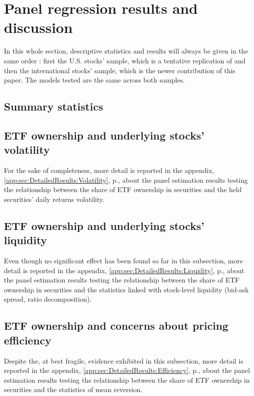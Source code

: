 
\section{Panel regression results and discussion}
\label{sec:Results}
In this whole section, descriptive statistics and results will always be given in the same order : first the U.S. stocks' sample, which is a tentative replication of \textcite{Ben-David2018} and then the international stocks' sample, which is the newer contribution of this paper. The models tested are the same across both samples.
\subsection{Summary statistics}

\subsection{ETF ownership and underlying stocks' volatility}
\label{sec:Results:sub:Volatility}

For the sake of completeness, more detail is reported in the appendix, \autoref{app:sec:DetailedResults:Volatility}, p.\pageref{app:sec:DetailedResults:Volatility},  about the panel estimation results testing the relationship between the share of ETF ownership in securities and the held securities' daily returns volatility. 
\begin{landscape}

\end{landscape}

\subsection{ETF ownership and underlying stocks' liquidity}
\label{sec:Results:sub:Liquidity}

Even though no significant effect has been found so far in this subsection, more detail is reported in the appendix, \autoref{app:sec:DetailedResults:Liquidity}, p.\pageref{app:sec:DetailedResults:Liquidity},  about the panel estimation results testing the relationship between the share of ETF ownership in securities and the statistics linked with stock-level liquidity (bid-ask spread, \textcite{Amihud2002} ratio decomposition).
\subsection{ETF ownership and concerns about pricing efficiency}
\label{sec:Results:sub:Efficiency}

Despite the, at best fragile, evidence exhibited in this subsection, more detail is reported in the appendix, \autoref{app:sec:DetailedResults:Efficiency}, p.\pageref{app:sec:DetailedResults:Efficiency}, about the panel estimation results testing the relationship between the share of ETF ownership in securities and the statistics of mean reversion.
